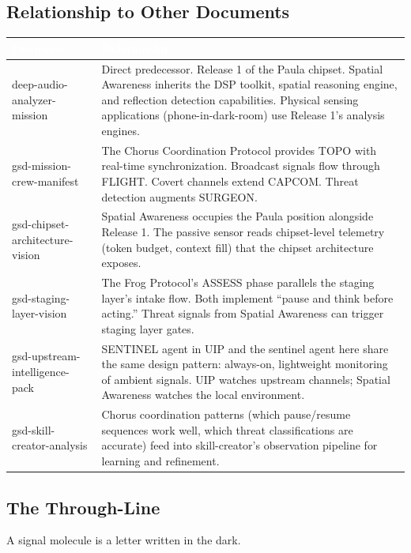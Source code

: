 \documentclass[11pt,letterpaper]{article}
\newcommand{\tableheader}[1]{\textbf{\sffamily\textcolor{white}{#1}}}
\begin{document}
\subsection{Relationship to Other Documents}

\begin{center}
\begin{tabularx}{\textwidth}{L{4.5cm}X}
\toprule
{}
\tableheader{Document} & \tableheader{Relationship} \\
\midrule
deep-audio-analyzer-mission & Direct predecessor. Release 1 of the Paula chipset. Spatial Awareness inherits the DSP toolkit, spatial reasoning engine, and reflection detection capabilities. Physical sensing applications (phone-in-dark-room) use Release 1's analysis engines. \\
gsd-mission-crew-manifest & The Chorus Coordination Protocol provides TOPO with real-time synchronization. Broadcast signals flow through FLIGHT. Covert channels extend CAPCOM. Threat detection augments SURGEON. \\
gsd-chipset-architecture-vision & Spatial Awareness occupies the Paula position alongside Release 1. The passive sensor reads chipset-level telemetry (token budget, context fill) that the chipset architecture exposes. \\
gsd-staging-layer-vision & The Frog Protocol's ASSESS phase parallels the staging layer's intake flow. Both implement ``pause and think before acting.'' Threat signals from Spatial Awareness can trigger staging layer gates. \\
gsd-upstream-intelligence-pack & SENTINEL agent in UIP and the sentinel agent here share the same design pattern: always-on, lightweight monitoring of ambient signals. UIP watches upstream channels; Spatial Awareness watches the local environment. \\
gsd-skill-creator-analysis & Chorus coordination patterns (which pause/resume sequences work well, which threat classifications are accurate) feed into skill-creator's observation pipeline for learning and refinement. \\
\bottomrule
\end{tabularx}
\end{center}

\subsection{The Through-Line}

A signal molecule is a letter written in the dark.
\end{document}
